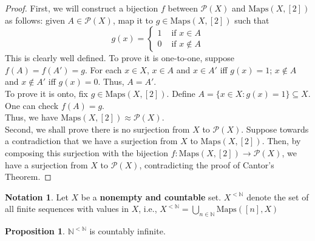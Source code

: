 \documentclass[14pt]{article}
\theoremstyle{definition}
\newtheorem{proposition}[definition]{Proposition}
\newtheorem{notation}[definition]{Notation}
\newcommand{\fun}[3]{#1\colon #2\rightarrow#3}
\newcommand{\bb}[1]{\mathbb{#1}}
\begin{document}
\begin{proof}
    First, we will construct a bijection $f$ between $\mathcal{P}(X)$ and $\mathrm{Maps}(X, [2])$ as follows:
    given $A\in \mathcal{P}(X)$, map it to $g\in\mathrm{Maps}(X, [2])$ such that 
    \begin{equation*}
        g(x)=\begin{cases}
            1 &\text{ if } x\in A\\
            0 &\text{ if } x\not\in A
        \end{cases}
    \end{equation*}
    This is clearly well defined. To prove it is one-to-one, suppose $f(A)=f(A')=g$.
    For each $x\in X$, $x\in A$ and $x\in A'$ iff $g(x)=1$; $x\not\in A$ and $x\not\in A'$ iff $g(x)=0$.
    Thus, $A=A'$.\\
    To prove it is onto, fix $g\in\mathrm{Maps}(X, [2])$. Define $A=\{x\in X\colon g(x)=1\}\subseteq X$.
    One can check $f(A)=g$.\\ Thus, we have $\mathrm{Maps}(X, [2])\approx \mathcal{P}(X)$. \\
    Second, we shall prove there is no surjection from $X$ to $\mathcal{P}(X)$. Suppose towards
    a contradiction that we have a surjection from $X$ to $\mathrm{Maps}(X, [2])$. Then, by composing this
    surjection with the bijection $\fun{f}{\mathrm{Maps}(X, [2])}{ \mathcal{P}(X)}$, we have a surjection from
    $X$ to $\mathcal{P}(X)$, contradicting the proof of Cantor's Theorem.
\end{proof}

\vspace{2mm}

\begin{notation}
    Let $X$ be a \textbf{nonempty and countable} set. $X^{<\bb{N}}$ denote the set of all finite sequences
    with values in $X$, i.e., $X^{<\bb{N}}=\bigcup_{n\in\bb{N}}\mathrm{Maps}([n], X)$
\end{notation}

\vspace{2mm}

\begin{proposition}
    $\bb{N}^{<\bb{N}}$ is countably infinite.
\end{proposition}
\end{document}
